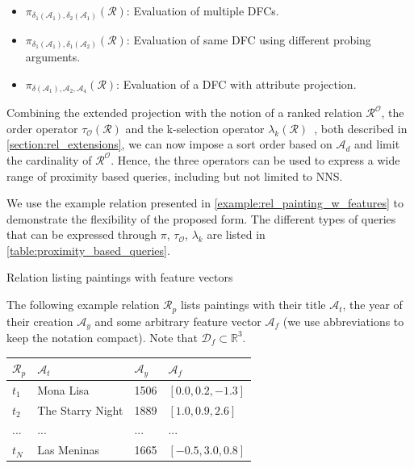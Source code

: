 \begin{itemize}
    \item $\pi_{\delta_1(\mathcal{A}_1), \delta_2(\mathcal{A}_1)}(\mathcal{R})$: Evaluation of multiple DFCs.
    \item $\pi_{\delta_1(\mathcal{A}_1), \delta_1(\mathcal{A}_2)}(\mathcal{R})$: Evaluation of same DFC using different probing arguments.
    \item $\pi_{\delta(\mathcal{A}_1), \mathcal{A}_2, \mathcal{A}_4}(\mathcal{R})$: Evaluation of a DFC with attribute projection.
\end{itemize}

Combining the extended projection with the notion of a ranked relation $\mathcal{R^{\mathcal{O}}}$, the order operator $\tau_{\mathcal{O}}(\mathcal{R})$ and the k-selection operator $\lambda_k(\mathcal{R})$~\cite{Chengkai:2005RankSQL}, both described in \cref{section:rel_extensions}, we can now impose a sort order based on $\mathcal{A}_d$ and limit the cardinality of $\mathcal{R}^{\mathcal{O}}$. Hence, the three operators can be used to express a wide range of proximity based queries, including but not limited to NNS.

We use the example relation presented in \cref{example:rel_painting_w_features} to demonstrate the flexibility of the proposed form. The different types of queries that can be expressed through $\pi$, $\tau_{\mathcal{O}}$, $\lambda_k$ are listed in \cref{table:proximity_based_queries}.

\begin{example}[label=example:rel_painting_w_features]{Relation listing paintings with feature vectors}{}
    
    The following example relation $\mathcal{R}_{p}$ lists paintings with their title $\mathcal{A}_{t}$, the year of their creation $\mathcal{A}_{y}$ and some arbitrary feature vector $\mathcal{A}_{f}$ (we use abbreviations to keep the notation compact). Note that $\mathcal{D}_{f} \subset \mathbb{R}^{3}$.
        
    \begin{center}
        \begin{tabular}{ l || l | l | l |}
            $\mathcal{R}_{p}$ & $\mathcal{A}_{t}$  & $\mathcal{A}_{y}$  & $\mathcal{A}_{f}$ \\ 
            \hline
            \hline
            $t_1$ & Mona Lisa & 1506 & $\left\lbrack 0.0, 0.2, -1.3 \right\rbrack$ \\
            \hline
            $t_2$ & The Starry Night & 1889 & $\left\lbrack 1.0, 0.9, 2.6 \right\rbrack$ \\
            \hline
            ... & ... & ... & ... \\
            \hline
            $t_N$ & Las Meninas & 1665 & $\left\lbrack -0.5, 3.0, 0.8 \right\rbrack$ \\
            \hline
        \end{tabular}
    \end{center}
\end{example}

